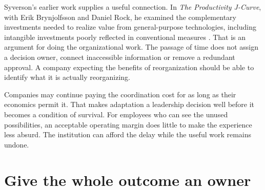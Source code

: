 \begin{EssayColumns}
Syverson's earlier work supplies a useful connection. In \emph{The
Productivity J-Curve}, with Erik Brynjolfsson and Daniel Rock, he
examined the complementary investments needed to realize value from
general-purpose technologies, including intangible investments poorly
reflected in conventional measures \citep{brynjolfsson2021jcurve}. That
is an argument for doing the organizational work. The passage of time
does not assign a decision owner, connect inaccessible information or
remove a redundant approval. A company expecting the benefits of
reorganization should be able to identify what it is actually
reorganizing.

Companies may continue paying the coordination cost for as long as their
economics permit it. That makes adaptation a leadership decision well
before it becomes a condition of survival. For employees who can see the
unused possibilities, an acceptable operating margin does little to make
the experience less absurd. The institution can afford the delay while
the useful work remains undone.

\wrapstuffclear\end{EssayColumns}

\clearpage

\section{Give the whole outcome an
owner}\label{give-the-whole-outcome-an-owner}


